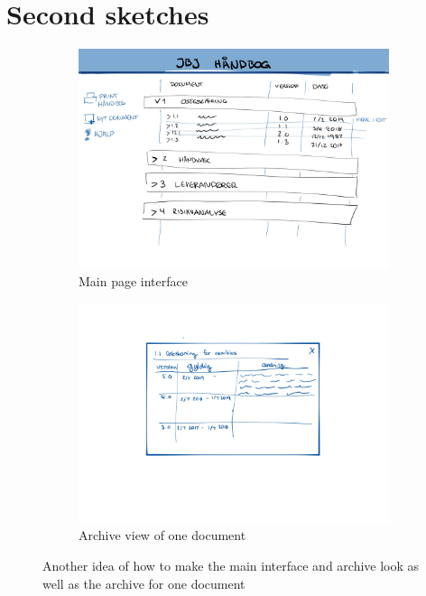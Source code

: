 \section{Second sketches}\label{sec:Second-sketches}
\begin{figure}[H]
	\centering
	\begin{subfigure}[b]{0.48\textwidth}
		\includegraphics[width=\textwidth]{billeder/Main-view2.jpg}
		\caption{Main page interface}
		\label{fig:2-Main}
	\end{subfigure}
	\quad
	\begin{subfigure}[b]{0.48\textwidth}
		\includegraphics[width=\textwidth]{billeder/Archive-view2.jpg}
		\caption{Archive view of one document}
		\label{fig:2-Archive}
	\end{subfigure}
	\caption{Another idea of how to make the main interface and archive look as well as the archive for one document}
\end{figure}

